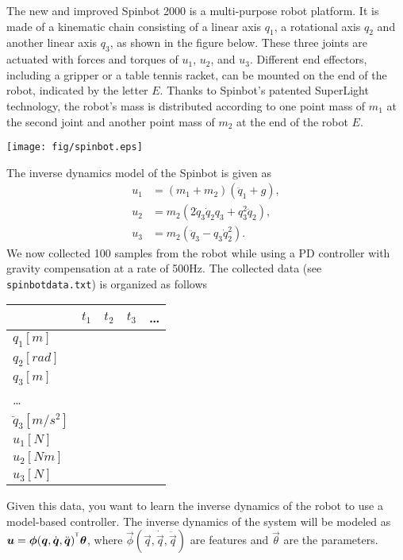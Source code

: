 The new and improved Spinbot 2000 is a multi-purpose robot platform.
It is made of a kinematic chain consisting of a linear axis $q_{1}$, a rotational axis $q_{2}$ and another linear axis $q_{3}$, as shown in the figure below.
These three joints are actuated with forces and torques of $u_{1}$, $u_{2}$, and $u_{3}$.
Different end effectors, including a gripper or a table tennis racket, can be mounted on the end of the robot, indicated by the letter $E$.
Thanks to Spinbot's patented SuperLight technology, the robot's mass is distributed according to one point mass of $m_{1}$ at the second joint and another point mass of $m_{2}$ at the end of the robot $E$.

\texttt{[image: fig/spinbot.eps]}

The inverse dynamics model of the Spinbot is given as
\begin{align*}
u_{1} &= (m_{1}+m_{2})(\ddot{q}_{1}+g),\\
u_{2} &= m_{2}(2\dot{q}_{3}\dot{q}_{2}q_{3}+q_{3}^{2}\ddot{q}_{2}),\\
u_{3} &= m_{2}(\ddot{q}_{3}-q_{3}\dot{q}_{2}^{2}).
\end{align*}
We now collected 100 samples from the robot while using a PD controller with gravity compensation at a rate of 500Hz.
The collected data (see \texttt{spinbotdata.txt}) is organized as follows\\
\begin{tabular}{| l || c | c | c | l  }
  \hline
   & $t_1$ & $t_2$ & $t_3$ & \ldots\\
  \hline
  \hline
  $q_{1}[m]$ &  &  &  & \\
  \hline
  $q_{2}[rad]$ &  &  &  & \\
  \hline
  $q_{3}[m]$ &  &  &  & \\
  \hline
  \ldots &  &  &  &  \\
  \hline
  $\ddot{q}_{3}[m/s^{2}]$ &  &  &  & \\
  \hline
  $u_{1}[N]$ &  &  &  & \\
  \hline
  $u_{2}[Nm]$ &  &  &  & \\
  \hline
  $u_{3}[N]$ &  &  &  & \\
  \hline
\end{tabular}

Given this data, you want to learn the inverse dynamics of the robot to use a model-based controller.
The inverse dynamics of the system will be modeled as ${\boldsymbol{u}}={\boldsymbol{\phi}}({\boldsymbol{q}},\dot{{\boldsymbol{q}}},\ddot{{\boldsymbol{q}}})^{^\mathsf{T}}{\boldsymbol{\theta}}$, where $\vec{\phi}(\vec{q},\dot{\vec{q}},\ddot{\vec{q}})$ are features and $\vec{\theta}$ are the parameters.

